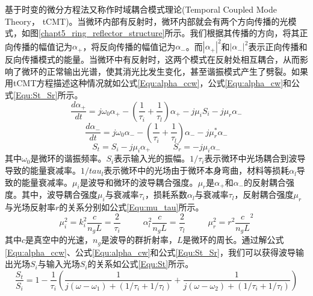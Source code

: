 基于时变的微分方程法又称作时域耦合模式理论(Temporal Coupled Mode Theory， tCMT)。当微环内部有反射时，微环内部就会有两个方向传播的光模式，如图\ref{chapt5_ring_reflector_structure}所示。我们根据其传播的方向，将其正向传播的幅值记为$\alpha_+$，将反向传播的幅值记为$\alpha_-$。而$|\alpha_+|^2$和$|\alpha_-|^2$表示正向传播和反向传播模式的能量。当微环中有反射时，这两个模式在反射处相互耦合，从而影响了微环的正常输出光谱，使其消光比发生变化，甚至谐振模式产生了劈裂。如果用tCMT方程描述这种情况就如公式\ref{Equ:alpha_ccw}，公式\ref{Equ:alpha_cw}和公式\ref{Equ:St_Sr}所示\cite{Li2016design}。
\begin{equation}
\label{Equ:alpha_ccw}
\frac{d\alpha_+}{dt}=j\omega_0\alpha_+-\left(\frac{1}{\tau_i}+\frac{1}{\tau_l}\right)\alpha_+-j\mu_iS_i-j\mu_r\alpha_-
\end{equation}
\begin{equation}
\label{Equ:alpha_cw}
\frac{d\alpha_-}{dt}=j\omega_0\alpha_--\left(\frac{1}{\tau_i}+\frac{1}{\tau_l}\right)\alpha_--j\mu_r^*\alpha_-
\end{equation}
\begin{equation}
\label{Equ:St_Sr}
S_t = S_i-j\mu_i\alpha_+ ~~~~~~~~~~~~ S_r = -j\mu_i\alpha_-
\end{equation}
其中$\omega_0$是微环的谐振频率。$S_i$表示输入光的振幅。$1/\tau_i$表示微环中光场耦合到波导导致的能量衰减率。$1/tau_l$表示微环中的光场由于微环本身弯曲，材料等损耗$\alpha_l$导致的能量衰减率。$\mu_i$是波导和微环的波导耦合强度。$\mu_r$是$\alpha_+$和$\alpha_-$的反射耦合强度。其中，波导耦合强度$\mu_i$与衰减率$\tau_i$，损耗系数$\alpha_l$与衰减率$\tau_l$，反射耦合强度$\mu_r$与光场反射率$r$的关系分别如公式\ref{Equ:mu_tau}所示\cite{little1997microring}。
\begin{equation}
\label{Equ:mu_tau}
\mu_i^2=k_i^2\frac{c}{n_gL}=\frac{2}{\tau_i}~~~~~~~~~~~~\alpha_l^2\frac{c}{n_gL}=\frac{2}{\tau_l}~~~~~~~~~~~~\mu_r^2=r^2\frac{c}{n_gL}^2
\end{equation}
其中$c$是真空中的光速，$n_g$是波导的群折射率，$L$是微环的周长。通过解公式\ref{Equ:alpha_ccw}、公式\ref{Equ:alpha_cw}和公式\ref{Equ:St_Sr}，我们可以获得波导输出光场$S_i$与输入光场$S_i$的关系如公式\ref{Equ:St}所示。
\begin{equation}
\label{Equ:St}
\frac{S_t}{S_i}=1-\frac{1}{\tau_i}\left(\frac{1}{j(\omega-\omega_1)+(1/\tau_i+1/\tau_l)} + \frac{1}{j(\omega-\omega_2)+(1/\tau_i+1/\tau_l)}\right)
\end{equation}


